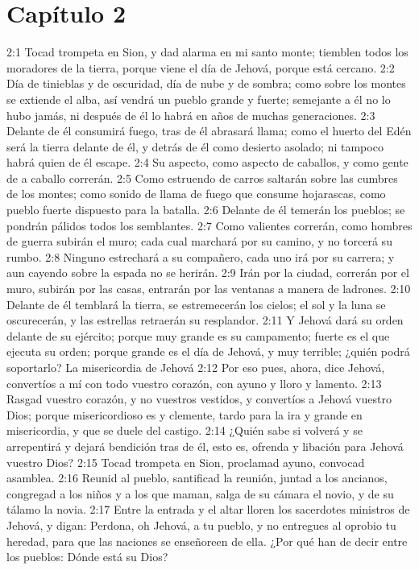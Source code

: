 \section*{Capítulo 2  }
  
2:1 Tocad trompeta en Sion, y dad alarma en mi santo monte; tiemblen todos los moradores de la tierra, porque viene el día de Jehová, porque está cercano.  
2:2 Día de tinieblas y de oscuridad, día de nube y de sombra; como sobre los montes se extiende el alba, así vendrá un pueblo grande y fuerte; semejante a él no lo hubo jamás, ni después de él lo habrá en años de muchas generaciones.  
2:3 Delante de él consumirá fuego, tras de él abrasará llama; como el huerto del Edén será la tierra delante de él, y detrás de él como desierto asolado; ni tampoco habrá quien de él escape.  
2:4 Su aspecto, como aspecto de caballos, y como gente de a caballo correrán.  
2:5 Como estruendo de carros saltarán sobre las cumbres de los montes; como sonido de llama de fuego que consume hojarascas, como pueblo fuerte dispuesto para la batalla. 
2:6 Delante de él temerán los pueblos; se pondrán pálidos todos los semblantes.  
2:7 Como valientes correrán, como hombres de guerra subirán el muro; cada cual marchará por su camino, y no torcerá su rumbo.  
2:8 Ninguno estrechará a su compañero, cada uno irá por su carrera; y aun cayendo sobre la espada no se herirán.  
2:9 Irán por la ciudad, correrán por el muro, subirán por las casas, entrarán por las ventanas a manera de ladrones.  
2:10 Delante de él temblará la tierra, se estremecerán los cielos; el sol y la luna se oscurecerán, y las estrellas retraerán su resplandor. 
2:11 Y Jehová dará su orden delante de su ejército; porque muy grande es su campamento; fuerte es el que ejecuta su orden; porque grande es el día de Jehová, y muy terrible; ¿quién podrá soportarlo?   
La misericordia de Jehová  
2:12 Por eso pues, ahora, dice Jehová, convertíos a mí con todo vuestro corazón, con ayuno y lloro y lamento.  
2:13 Rasgad vuestro corazón, y no vuestros vestidos, y convertíos a Jehová vuestro Dios; porque misericordioso es y clemente, tardo para la ira y grande en misericordia, y que se duele del castigo.  
2:14 ¿Quién sabe si volverá y se arrepentirá y dejará bendición tras de él, esto es, ofrenda y libación para Jehová vuestro Dios?  
2:15 Tocad trompeta en Sion, proclamad ayuno, convocad asamblea.  
2:16 Reunid al pueblo, santificad la reunión, juntad a los ancianos, congregad a los niños y a los que maman, salga de su cámara el novio, y de su tálamo la novia.  
2:17 Entre la entrada y el altar lloren los sacerdotes ministros de Jehová, y digan: Perdona, oh Jehová, a tu pueblo, y no entregues al oprobio tu heredad, para que las naciones se enseñoreen de ella. ¿Por qué han de decir entre los pueblos: Dónde está su Dios?  
